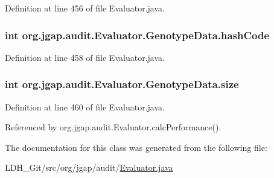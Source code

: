 Definition at line 456 of file Evaluator.\-java.

\hypertarget{classorg_1_1jgap_1_1audit_1_1_evaluator_1_1_genotype_data_aa1d091061dfca764d2e834a359b361d0}{
\subsubsection[{hash\-Code}]{\setlength{\rightskip}{0pt plus 5cm}int org.\-jgap.\-audit.\-Evaluator.\-Genotype\-Data.\-hash\-Code}}\label{classorg_1_1jgap_1_1audit_1_1_evaluator_1_1_genotype_data_aa1d091061dfca764d2e834a359b361d0}


Definition at line 458 of file Evaluator.\-java.

\hypertarget{classorg_1_1jgap_1_1audit_1_1_evaluator_1_1_genotype_data_aefc2b641dde439986c8f35147100c95c}{
\subsubsection[{size}]{\setlength{\rightskip}{0pt plus 5cm}int org.\-jgap.\-audit.\-Evaluator.\-Genotype\-Data.\-size}}\label{classorg_1_1jgap_1_1audit_1_1_evaluator_1_1_genotype_data_aefc2b641dde439986c8f35147100c95c}


Definition at line 460 of file Evaluator.\-java.



Referenced by org.\-jgap.\-audit.\-Evaluator.\-calc\-Performance().



The documentation for this class was generated from the following file\-:\begin{DoxyCompactItemize}
\item 
L\-D\-H\-\_\-\-Git/src/org/jgap/audit/\hyperlink{_evaluator_8java}{Evaluator.\-java}\end{DoxyCompactItemize}
